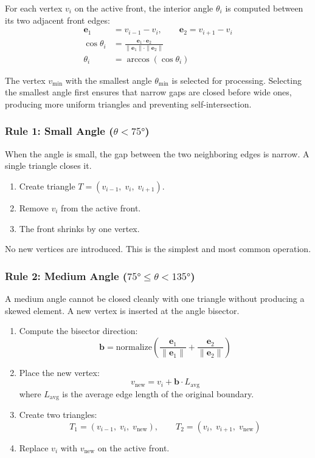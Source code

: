 \documentclass[12pt,a4paper]{article}
\begin{document}
For each vertex $v_i$ on the active front, the interior angle $\theta_i$ is computed between its two adjacent front edges:
\begin{align}
  \mathbf{e}_1 &= v_{i-1} - v_i, \qquad \mathbf{e}_2 = v_{i+1} - v_i \\[4pt]
  \cos\theta_i &= \frac{\mathbf{e}_1 \cdot \mathbf{e}_2}{\|\mathbf{e}_1\| \cdot \|\mathbf{e}_2\|} \\[4pt]
  \theta_i &= \arccos(\cos\theta_i)
\end{align}

The vertex $v_{\min}$ with the smallest angle $\theta_{\min}$ is selected for processing. Selecting the smallest angle first ensures that narrow gaps are closed before wide ones, producing more uniform triangles and preventing self-intersection.

\subsubsection{Rule 1: Small Angle ($\theta < 75°$)}

When the angle is small, the gap between the two neighboring edges is narrow. A single triangle closes it.

\begin{enumerate}[leftmargin=2em]
  \item Create triangle $T = (v_{i-1},\; v_i,\; v_{i+1})$.
  \item Remove $v_i$ from the active front.
  \item The front shrinks by one vertex.
\end{enumerate}

No new vertices are introduced. This is the simplest and most common operation.

\subsubsection{Rule 2: Medium Angle ($75° \leq \theta < 135°$)}

A medium angle cannot be closed cleanly with one triangle without producing a skewed element. A new vertex is inserted at the angle bisector.

\begin{enumerate}[leftmargin=2em]
  \item Compute the bisector direction:
    \[
      \mathbf{b} = \mathrm{normalize}\!\left(\frac{\mathbf{e}_1}{\|\mathbf{e}_1\|} + \frac{\mathbf{e}_2}{\|\mathbf{e}_2\|}\right)
    \]
  \item Place the new vertex:
    \[
      v_{\text{new}} = v_i + \mathbf{b} \cdot L_{\text{avg}}
    \]
    where $L_{\text{avg}}$ is the average edge length of the original boundary.
  \item Create two triangles:
    \[
      T_1 = (v_{i-1},\; v_i,\; v_{\text{new}}), \qquad T_2 = (v_i,\; v_{i+1},\; v_{\text{new}})
    \]
  \item Replace $v_i$ with $v_{\text{new}}$ on the active front.
\end{enumerate}
\end{document}
